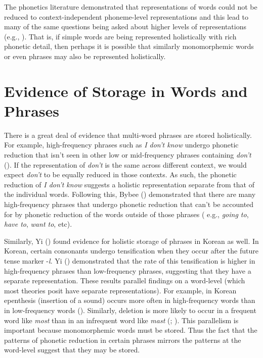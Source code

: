 \documentclass[
  12pt,
  letterpaper,
]{scrreprt}
\begin{document}
The phonetics literature demonstrated that representations of words
could not be reduced to context-independent phoneme-level
representations and this lead to many of the same questions being asked
about higher levels of representations (e.g.,
). That is, if simple words are
being represented holistically with rich phonetic detail, then perhaps
it is possible that similarly monomorphemic words or even phrases may
also be represented holistically.

\section{Evidence of Storage in Words and
Phrases}\label{sec-evidence-of-storage-in-words-and-phrases}

There is a great deal of evidence that multi-word phrases are stored
holistically. For example, high-frequency phrases such as \emph{I don't
know} undergo phonetic reduction that isn't seen in other low or
mid-frequency phrases containing \emph{don't}
().
If the representation of \emph{don't} is the same across different
context, we would expect \emph{don't} to be equally reduced in those
contexts. As such, the phonetic reduction of \emph{I don't know}
suggests a holistic representation separate from that of the individual
words. Following this, Bybee ()
demonstrated that there are many high-frequency phrases that undergo
phonetic reduction that can't be accounted for by phonetic reduction of
the words outside of those phrases ( e.g., \emph{going to}, \emph{have
to}, \emph{want to}, etc).

Similarly, Yi () found evidence for
holistic storage of phrases in Korean as well. In Korean, certain
consonants undergo tensification when they occur after the future tense
marker -\emph{l}. Yi () demonstrated
that the rate of this tensification is higher in high-frequency phrases
than low-frequency phrases, suggesting that they have a separate
representation. These results parallel findings on a word-level (which
most theories posit have separate representations). For example, in
Korean epenthesis (insertion of a sound) occurs more often in
high-frequency words than in low-frequency words
(). Similarly, deletion is more likely to occur in a
frequent word like \emph{most} than in an infrequent word like
\emph{mast} (;
). This parallelism is important because monomorphemic words must
be stored. Thus the fact that the patterns of phonetic reduction in
certain phrases mirrors the patterns at the word-level suggest that they
may be stored.
\end{document}

